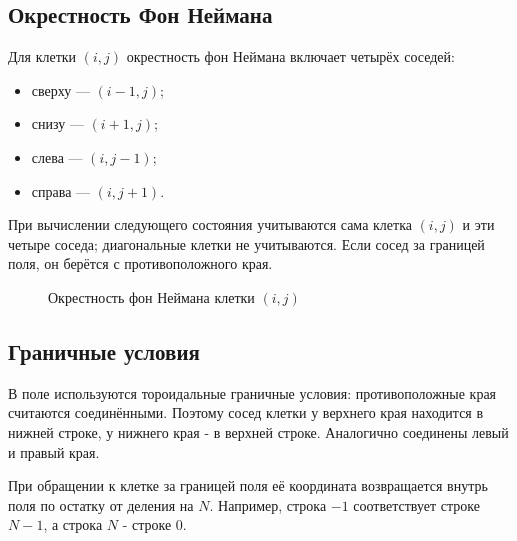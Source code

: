 \subsection{Окрестность Фон Неймана}

Для клетки $(i,j)$ окрестность фон Неймана включает четырёх соседей:

\begin{itemize}
    \item сверху --- $(i-1,j)$;
    \item снизу --- $(i+1,j)$;
    \item слева --- $(i,j-1)$;
    \item справа --- $(i,j+1)$.
\end{itemize}

При вычислении следующего состояния учитываются сама клетка $(i,j)$ и эти
четыре соседа; диагональные клетки не учитываются. Если сосед за границей
поля, он берётся с противоположного края.

\begin{figure}[htbp]
    \centering
    \caption{Окрестность фон Неймана клетки $(i,j)$}
    \label{fig:von-neumann-neighbourhood}
\end{figure}

\subsection{Граничные условия}

В поле используются тороидальные граничные условия: противоположные края
считаются соединёнными. Поэтому сосед клетки у верхнего края находится в
нижней строке, у нижнего края - в верхней строке. Аналогично соединены
левый и правый края.

При обращении к клетке за границей поля её координата возвращается внутрь
поля по остатку от деления на $N$. Например, строка $-1$ соответствует
строке $N-1$, а строка $N$ - строке $0$.

